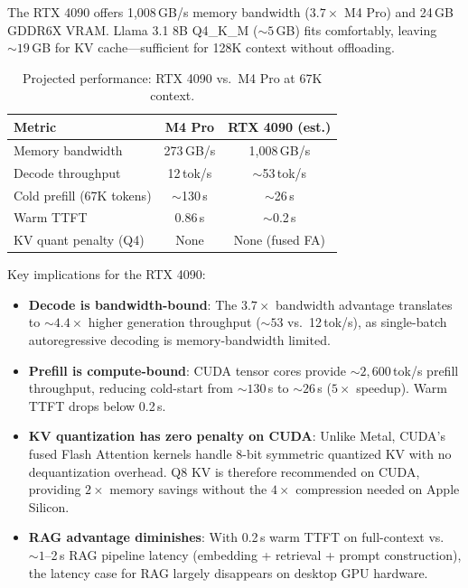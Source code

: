 \documentclass{article}
\begin{document}
The RTX 4090 offers 1,008\,GB/s memory bandwidth ($3.7\times$ M4 Pro) and
24\,GB GDDR6X VRAM. Llama 3.1 8B Q4\_K\_M (${\sim}5$\,GB) fits comfortably,
leaving ${\sim}19$\,GB for KV cache---sufficient for 128K context without
offloading.

\begin{table}[t]
\centering
\caption{Projected performance: RTX 4090 vs.\ M4 Pro at 67K context.}
\label{tab:hw_rtx}
\small
\begin{tabular}{lcc}
\toprule
\textbf{Metric} & \textbf{M4 Pro} & \textbf{RTX 4090 (est.)} \\
\midrule
Memory bandwidth & 273\,GB/s & 1,008\,GB/s \\
Decode throughput & 12\,tok/s & ${\sim}$53\,tok/s \\
Cold prefill (67K tokens) & ${\sim}$130\,s & ${\sim}$26\,s \\
Warm TTFT & 0.86\,s & ${\sim}$0.2\,s \\
KV quant penalty (Q4) & None & None (fused FA) \\
\bottomrule
\end{tabular}
\end{table}

Key implications for the RTX 4090:
\begin{itemize}
\item \textbf{Decode is bandwidth-bound}: The $3.7\times$ bandwidth advantage
  translates to ${\sim}4.4\times$ higher generation throughput (${\sim}53$
  vs.\ 12\,tok/s), as single-batch autoregressive decoding is memory-bandwidth
  limited.
\item \textbf{Prefill is compute-bound}: CUDA tensor cores provide
  ${\sim}2,600$\,tok/s prefill throughput, reducing cold-start from ${\sim}130$\,s
  to ${\sim}26$\,s ($5\times$ speedup). Warm TTFT drops below 0.2\,s.
\item \textbf{KV quantization has zero penalty on CUDA}: Unlike Metal, CUDA's
  fused Flash Attention kernels handle 8-bit symmetric quantized KV with no
  dequantization overhead. Q8 KV is therefore recommended on CUDA, providing
  $2\times$ memory savings without the $4\times$ compression needed on Apple
  Silicon.
\item \textbf{RAG advantage diminishes}: With 0.2\,s warm TTFT on full-context
  vs.\ ${\sim}1$--2\,s RAG pipeline latency (embedding + retrieval + prompt
  construction), the latency case for RAG largely disappears on desktop GPU
  hardware.
\end{itemize}
\end{document}
